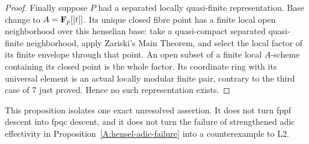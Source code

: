 \begin{proof}
Finally suppose $P$ had a separated locally quasi-finite
representation. Base change to $A=\mathbf F_p[[t]]$. Its unique closed
fibre point has a finite local open neighborhood over this
henselian base: take a quasi-compact separated quasi-finite
neighborhood, apply Zariski's Main Theorem, and select the local
factor of its finite envelope through that point. An open subset
of a finite local $A$-scheme containing its closed point is the
whole factor. Its coordinate ring with its universal element is
an actual locally modular finite pair, contrary to the third
case of 7 just proved. Hence no such representation exists.
\end{proof}

This proposition isolates one exact unresolved assertion. It does
not turn fppf descent into fpqc descent, and it does not turn the
failure of strengthened adic effectivity in
Proposition~\ref{A:hensel-adic-failure} into a counterexample to L2.
